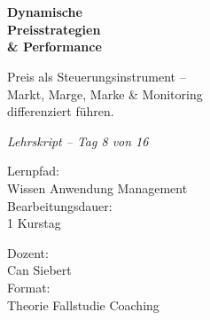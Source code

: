 \documentclass[11pt,a4paper,oneside]{article}
\newcommand{\caveatfontfallback}{\itshape}
\newcommand\caveatfont{\caveatfontfallback}%
\begin{document}
\begin{titlepage}
  \pagestyle{empty}
  \vspace*{1.5cm}
  \\[2pt]
  \noindent{\color{lpAccent}\rule{\linewidth}{1.2pt}}\\[4pt]

  \vspace{3cm}
  {\sffamily\fontsize{30}{34}\selectfont\bfseries\color{lpInk}Dynamische\\Preisstrategien\\\& Performance\par}

  \vspace{0.7cm}
  {\sffamily\large\color{lpGray}Preis als Steuerungsinstrument --\\Markt, Marge, Marke \& Monitoring\\differenziert führen.\par}

  \vspace{1.5cm}
  {\caveatfont\LARGE\color{lpAmber}Lehrskript -- Tag 8 von 16}\par

  \vfill

  \noindent\begin{minipage}{0.55\linewidth}
    {\sffamily\footnotesize\color{lpGray}Lernpfad:}\\
    {\sffamily\small\color{lpInk}Wissen \textrightarrow{} Anwendung \textrightarrow{} Management}\\[10pt]
    {\sffamily\footnotesize\color{lpGray}Bearbeitungsdauer:}\\
    {\sffamily\small\color{lpInk}1 Kurstag}
  \end{minipage}\hfill
  \begin{minipage}{0.4\linewidth}
    \raggedleft
    {\sffamily\footnotesize\color{lpGray}Dozent:}\\
    {\sffamily\small\color{lpInk}Can Siebert}\\[10pt]
    {\sffamily\footnotesize\color{lpGray}Format:}\\
    {\sffamily\small\color{lpInk}Theorie \textperiodcentered{} Fallstudie \textperiodcentered{} Coaching}
  \end{minipage}

  \vspace{0.5cm}
  \noindent{\color{lpAccent}\rule{\linewidth}{0.6pt}}
\end{titlepage}
\end{document}
